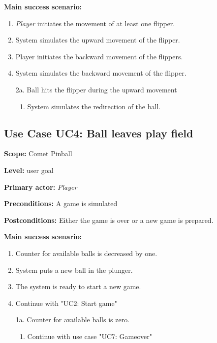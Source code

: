 \documentclass[fontsize=12pt,
               paper=a4,
               twoside=false,
               parskip=half,
               ]{scrartcl}
\begin{document}
\textbf{\textsf{Main success scenario:}}

\begin{enumerate}[leftmargin=3em]
	\item \emph{Player} initiates the movement of at least one flipper.
	\item System simulates the upward movement of the flipper.
	\item Player initiates the backward movement of the flippers.
	\item System simulates the backward movement of the flipper.
\end{enumerate}


\begin{itemize}[leftmargin=3em]
	\item[2a.] Ball hits the flipper during the upward movement
	\begin{enumerate}
		\item System simulates the redirection of the ball.
	\end{enumerate}
\end{itemize}


\subsection{Use Case UC4: Ball leaves play field}

\textbf{\textsf{Scope:}} Comet Pinball

\textbf{\textsf{Level:}} user goal

\textbf{\textsf{Primary actor:}} \emph{Player}

\textbf{\textsf{Preconditions:}} A game is simulated

\textbf{\textsf{Postconditions:}} Either the game is over or a new game is prepared.

\textbf{\textsf{Main success scenario:}}

\begin{enumerate}[leftmargin=3em]
	\item Counter for available balls is decreased by one.
	\item System puts a new ball in the plunger.
	\item The system is ready to start a new game.
	\item Continue with "UC2: Start game"
\end{enumerate}


\begin{itemize}[leftmargin=3em]
	\item[1a.] Counter for available balls is zero.
	\begin{enumerate}
		\item Continue with use case "UC7: Gameover"
	\end{enumerate}
\end{itemize}
\end{document}
